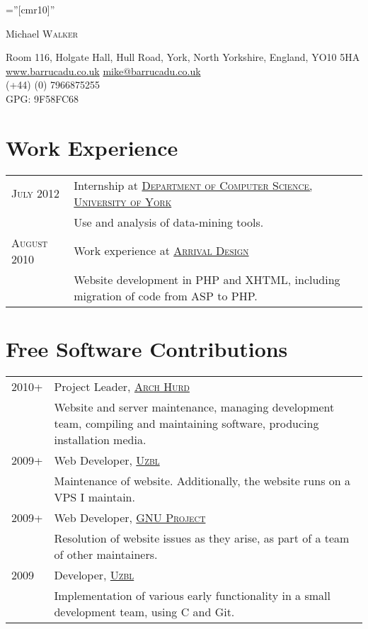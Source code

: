 \documentclass[a4paper,10pt]{article}
\newcommand{\schref}[2]{\href{#1}{\textsc{#2}}}
\newcommand{\mhref}[1]{\href{mailto:#1}{#1}}
\newcommand{\hhref}[1]{\href{http://#1}{#1}}
\newenvironment{cvtable}{\begin{tabular}{x{2cm}|p{11.6cm}}}{\end{tabular}}
\newcommand{\rowhead}[1]{\textsc{#1} &}
\newcommand{\rowdetail}[1]{& \footnotesize{#1}}
\begin{document}
\pagestyle{empty} %

\font\fb=''[cmr10]'' %

\par{\centering
		{\Huge Michael \textsc{Walker}
	}\bigskip\par}

{\centering
Room 116, Holgate Hall, Hull Road, York, North Yorkshire, England,
YO10 5HA\\
\hhref{www.barrucadu.co.uk} \mhref{mike@barrucadu.co.uk}\\
(+44) (0) 7966875255\\
GPG: 9F58FC68\\
}

\section{Work Experience}
\begin{cvtable}
  \rowhead{July 2012} Internship at \schref{http://cs.york.ac.uk}{Department of Computer Science, University of York} \\
  \rowdetail{Use and analysis of data-mining tools.} \\

  \rowhead{August 2010} Work experience at \schref{http://www.arrivaldesign.co.uk/}{Arrival Design} \\
  \rowdetail{Website development in PHP and XHTML, including migration of code from ASP to PHP.}
\end{cvtable}

\section{Free Software Contributions}
\begin{cvtable}
  \rowhead{2010+} Project Leader, \schref{http://www.archhurd.org}{Arch Hurd}\\
  \rowdetail{Website and server maintenance, managing development team, compiling and maintaining software, producing installation media.}\\

  \rowhead{2009+} Web Developer, \schref{http://www.uzbl.org}{Uzbl}\\
  \rowdetail{Maintenance of website. Additionally, the website runs on a VPS I maintain.}\\

  \rowhead{2009+} Web Developer, \schref{http://www.gnu.org}{GNU Project}\\
  \rowdetail{Resolution of website issues as they arise, as part of a team of other maintainers.}\\

  \rowhead{2009}  Developer, \schref{http://www.uzbl.org}{Uzbl}\\
  \rowdetail{Implementation of various early functionality in a small development team, using C and Git.}
\end{cvtable}
\end{document}
